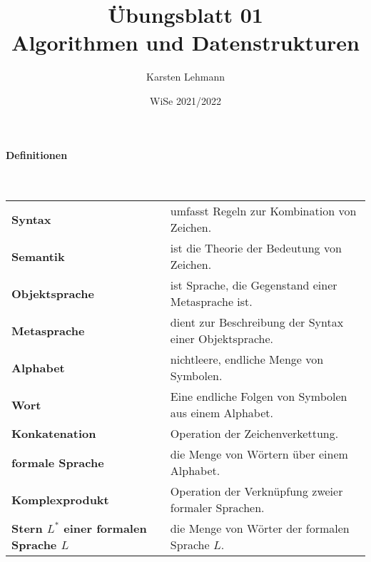\documentclass{scrreprt}
\author{Karsten Lehmann}
\date{WiSe 2021/2022}
\title{Übungsblatt 01\\Algorithmen und Datenstrukturen}
\begin{document}
\paragraph{Definitionen}
\,\\
\begin{tabular}{l l}
  \textbf{Syntax} & umfasst Regeln zur Kombination von Zeichen. \\
  \textbf{Semantik} & ist die Theorie der Bedeutung von Zeichen. \\
  \textbf{Objektsprache} & ist Sprache, die Gegenstand einer Metasprache ist. \\
  \textbf{Metasprache} & dient zur Beschreibung der Syntax einer Objektsprache. \\
  \textbf{Alphabet} & nichtleere, endliche Menge von Symbolen. \\
  \textbf{Wort} & Eine endliche Folgen von Symbolen aus einem Alphabet. \\
  \textbf{Konkatenation} & Operation der Zeichenverkettung. \\
  \textbf{formale Sprache} & die Menge von Wörtern über einem Alphabet. \\
  \textbf{Komplexprodukt} & Operation der Verknüpfung zweier formaler Sprachen. \\
  \textbf{Stern $L^*$ einer formalen Sprache $L$} & die Menge von Wörter der formalen Sprache $L$. \\
\end{tabular}
\end{document}
